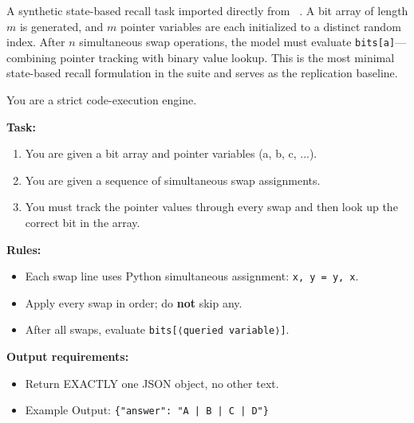 \documentclass[11pt]{article}
\theoremstyle{definition}
\begin{document}
A synthetic state-based recall task imported directly from ~\cite{merrill2026olmo}. A bit array of length $m$ is generated, and $m$ pointer variables are each initialized to a distinct random index. After $n$ simultaneous swap operations, the model must evaluate \texttt{bits[a]}---combining pointer tracking with binary value lookup. This is the most minimal state-based recall formulation in the suite and serves as the replication baseline.

\begin{tcolorbox}[colback=gray!5!white, colframe=gray!75!black, title=System Prompt, breakable]
\small
You are a strict code-execution engine.

\textbf{Task:}
\begin{enumerate}
\item You are given a bit array and pointer variables (a, b, c, ...).
\item You are given a sequence of simultaneous swap assignments.
\item You must track the pointer values through every swap and then look up the correct bit in the array.
\end{enumerate}

\textbf{Rules:}
\begin{itemize}
\item Each swap line uses Python simultaneous assignment: \texttt{x, y = y, x}.
\item Apply every swap in order; do \textbf{not} skip any.
\item After all swaps, evaluate \texttt{bits[⟨queried variable⟩]}.
\end{itemize}

\textbf{Output requirements:}
\begin{itemize}
\item Return EXACTLY one JSON object, no other text.
\item Example Output: \texttt{\{"answer": "A | B | C | D"\}}
\end{itemize}

\end{tcolorbox}
\end{document}
